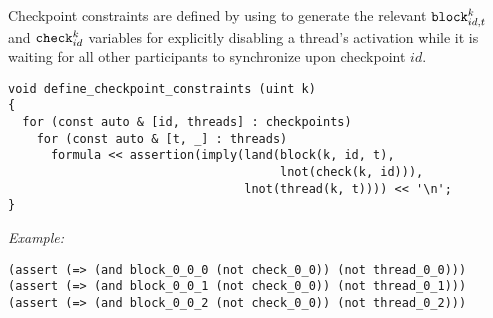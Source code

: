 

\noindent
Checkpoint constraints are defined by using  to generate the relevant $\texttt{block}^k_{id, t}$ and $\texttt{check}^k_{id}$ variables for explicitly disabling a thread's activation while it is waiting for all other participants to synchronize upon checkpoint $id$.

\begin{lstlisting}[style=c++]
void define_checkpoint_constraints (uint k)
{
  for (const auto & [id, threads] : checkpoints)
    for (const auto & [t, _] : threads)
      formula << assertion(imply(land(block(k, id, t),
                                      lnot(check(k, id))),
                                 lnot(thread(k, t)))) << '\n';
}
\end{lstlisting}


\newpage
\noindent
\emph{Example:} 

\begin{lstlisting}[style=smtlib]
(assert (=> (and block_0_0_0 (not check_0_0)) (not thread_0_0)))
(assert (=> (and block_0_0_1 (not check_0_0)) (not thread_0_1)))
(assert (=> (and block_0_0_2 (not check_0_0)) (not thread_0_2)))
\end{lstlisting}

